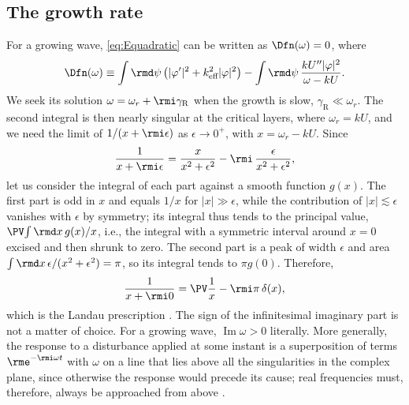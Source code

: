 \subsection{The growth rate}\label{app:rayleigh_growth}

For a growing wave, \cref{eq:Equadratic} can be written as \(\Dfn(\omega) = 0\), where
\begin{equation}
\Dfn(\omega)\equiv\int\rmd\psi\left(|\varphi'|^2 + k_\text{eff}^2|\varphi|^2\right) - \int\rmd\psi\,\frac{kU''|\varphi|^2}{\omega - kU}.
\label{eq:Edispersion}
\end{equation}
We seek its solution \(\omega = \omega_r + \rmi\gamma_\text{R}\) when the growth is slow, \(\gamma_\text{R}\ll\omega_r\). The second integral is then nearly singular at the critical layers, where \(\omega_r = kU\), and we need the limit of \(1/(x + \rmi\epsilon)\) as \(\epsilon\to0^+\), with \(x = \omega_r - kU\). Since
\begin{equation}
\frac{1}{x + \rmi\epsilon} = \frac{x}{x^2 + \epsilon^2} - \rmi\,\frac{\epsilon}{x^2 + \epsilon^2},
\label{eq:Esplit}
\end{equation}
let us consider the integral of each part against a smooth function \(g(x)\). The first part is odd in \(x\) and equals \(1/x\) for \(|x|\gg\epsilon\), while the contribution of \(|x|\lesssim\epsilon\) vanishes with \(\epsilon\) by symmetry; its integral thus tends to the principal value, \(\PV\!\int\rmd x\,g(x)/x\), i.e., the integral with a symmetric interval around \(x = 0\) excised and then shrunk to zero. The second part is a peak of width \(\epsilon\) and area \(\int\rmd x\,\epsilon/(x^2 + \epsilon^2) = \pi\), so its integral tends to \(\pi g(0)\). Therefore,
\begin{equation}
\frac{1}{x + \rmi0} = \PV\frac{1}{x} - \rmi\pi\,\delta(x),
\label{eq:Eplemelj}
\end{equation}
which is the Landau prescription \citep{Landau1946}. The sign of the infinitesimal imaginary part is not a matter of choice. For a growing wave, \(\operatorname{Im}\omega > 0\) literally. More generally, the response to a disturbance applied at some instant is a superposition of terms \(\rme^{-\rmi\omega t}\) with \(\omega\) on a line that lies above all the singularities in the complex plane, since otherwise the response would precede its cause; real frequencies must, therefore, always be approached from above \citep{Landau1946}.

